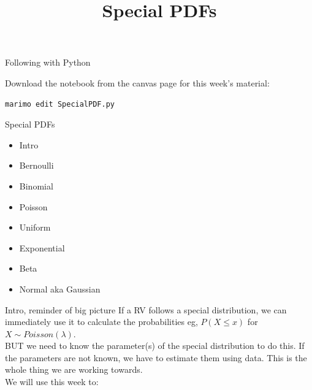 \documentclass[10pt,sans,english,compress,xcolor=dvipsnames]{beamer}
\title[Spesh]{Special PDFs}
\date{}
\begin{document}



\begin{frame}
\titlepage
\end{frame} 


\begin{frame}[fragile]{Following with Python}


Download the notebook from the canvas page for this week's material:  \\[1ex]

\begin{verbatim}
marimo edit SpecialPDF.py
\end{verbatim}

\end{frame} 

\begin{frame}{Special PDFs}
\large
\begin{itemize}
\item Intro\\[1ex]
\item Bernoulli \\[1ex]
\item Binomial \\[1ex]
\item Poisson\\[1ex]
\item Uniform\\[1ex]
\item Exponential\\[1ex]
\item Beta\\[1ex]
\item Normal aka Gaussian\\[1ex]
\end{itemize}

\end{frame} 


\begin{frame}{Intro, reminder of big picture}
If a RV follows a special distribution, we can immediately use it to calculate the probabilities  eg, $P(X\leq x)$ for $X\sim Poisson(\lambda)$. \\[1ex]

BUT we need to know the parameter(s) of the special distribution to do this. If the parameters are not known, we have to estimate them using data. This is the whole thing we are working towards.\\[1ex]

We will use this week to:\\[1ex]
\\[1ex]
\\

\end{frame} 
\end{document}
